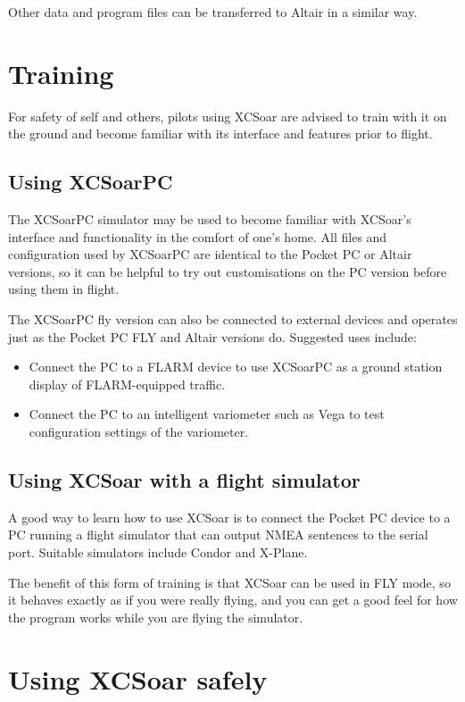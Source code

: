 \documentclass[a4paper,12pt]{refrep}
\begin{document}
Other data and program files can be transferred to Altair in a similar
way.

\section{Training}

For safety of self and others, pilots using XCSoar are advised to
train with it on the ground and become familiar with its interface and
features prior to flight.

\subsection*{Using XCSoarPC}

The XCSoarPC simulator may be used to become familiar with XCSoar's
interface and functionality in the comfort of one's home.  All files
and configuration used by XCSoarPC are identical to the Pocket PC or
Altair versions, so it can be helpful to try out customisations on the
PC version before using them in flight.

The XCSoarPC fly version can also be connected to external devices
and operates just as the Pocket PC FLY and Altair versions do.
Suggested uses include:
\begin{itemize}
\item Connect the PC to a FLARM device to use XCSoarPC as a ground
station display of FLARM-equipped traffic.
\item Connect the PC to an intelligent variometer such as Vega to
test configuration settings of the variometer.
\end{itemize}

\subsection*{Using XCSoar with a flight simulator}

A good way to learn how to use XCSoar is to connect the Pocket PC
device to a PC running a flight simulator that can output NMEA
sentences to the serial port.  Suitable simulators include Condor and
X-Plane.  

The benefit of this form of training is that XCSoar can be used in FLY
mode, so it behaves exactly as if you were really flying, and you can
get a good feel for how the program works while you are flying the
simulator.

\section{Using XCSoar safely}
\end{document}
